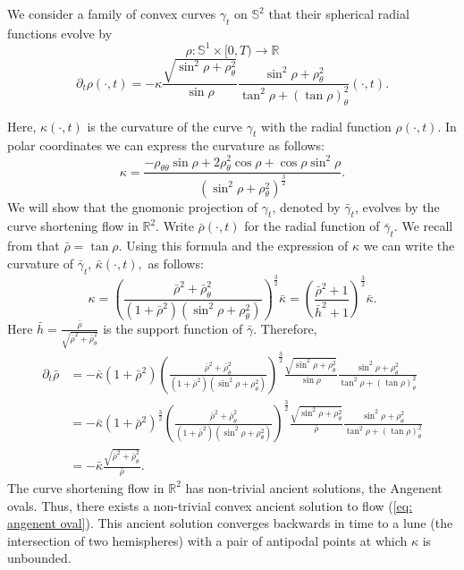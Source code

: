 \documentclass{amsart}
\begin{document}
\begin{example}
We consider a family of convex curves $\gamma_t$ on $\mathbb{S}^2$ that their spherical radial functions evolve by
\[\rho:\mathbb{S}^1\times[0,T)\to \mathbb{R}\]
\begin{equation}\label{eq: angenent oval}
\partial_t\rho(\cdot,t)=-\kappa \frac{\sqrt{\sin^2\rho+\rho_{\theta}^2}}{\sin\rho}\frac{\sin^2\rho+\rho_{\theta}^2}{\tan^2\rho+(\tan\rho)_{\theta}^2}(\cdot,t).
\end{equation}

Here, $\kappa(\cdot,t)$ is the curvature of the curve $\gamma_t$ with the radial function $\rho(\cdot,t).$ 
In polar coordinates we can express the curvature as follows:
\[\kappa=\frac{-\rho_{\theta\theta}\sin\rho+2\rho_\theta^2\cos\rho+\cos\rho\sin^2\rho}{(\sin^2\rho+\rho_{\theta}^2)^{\frac{3}{2}}}.\]
We will show that the gnomonic projection of $\gamma_t$, denoted by $\bar{\gamma}_t$, evolves by the curve shortening flow in $\mathbb{R}^2.$ Write $\bar{\rho}(\cdot,t)$ for the radial function of $\bar{\gamma}_t$. We recall from \cite[p.~8]{besau2014spherical} that
$\bar{\rho}=\tan\rho.$ Using this formula and the expression of $\kappa$ we can write the curvature of $\bar{\gamma}_t$,  $\bar{\kappa}(\cdot,t),$ as follows:
\[\kappa=\left(\frac{\bar{\rho}^2+\bar{\rho}_{\theta}^2}{(1+\bar{\rho}^2)(\sin^2\rho+\rho_{\theta}^2)}\right)^{\frac{3}{2}}\bar{\kappa}=\left(\frac{\bar{\rho}^2+1}{\bar{h}^2+1}\right)^{\frac{3}{2}}\bar{\kappa}.\]
Here $\bar{h}=\frac{\bar{\rho}}{\sqrt{\bar{\rho}^2+\bar{\rho}_{\theta}^2}}$ is the support function of $\bar{\gamma}.$
Therefore, 
\begin{align*}
\partial_t\bar{\rho}&=-\bar{\kappa}(1+\bar{\rho}^2)\left(\frac{\bar{\rho}^2+\bar{\rho}_{\theta}^2}{(1+\bar{\rho}^2)(\sin^2\rho+\rho_{\theta}^2)}\right)^{\frac{3}{2}}\frac{\sqrt{\sin^2\rho+\rho_{\theta}^2}}{\sin\rho}\frac{\sin^2\rho+\rho_{\theta}^2}{\tan^2\rho+(\tan\rho)_{\theta}^2}\\
&=-\bar{\kappa}(1+\bar{\rho}^2)^{\frac{3}{2}}\left(\frac{\bar{\rho}^2+\bar{\rho}_{\theta}^2}{(1+\bar{\rho}^2)(\sin^2\rho+\rho_{\theta}^2)}\right)^{\frac{3}{2}}\frac{\sqrt{\sin^2\rho+\rho_{\theta}^2}}{\bar{\rho}}\frac{\sin^2\rho+\rho_{\theta}^2}{\tan^2\rho+(\tan\rho)_{\theta}^2}\\
&=-\bar{\kappa}\frac{\sqrt{\bar{\rho}^2+\bar{\rho}_{\theta}^2}}{\bar{\rho}}.
\end{align*}
The curve shortening flow in $\mathbb{R}^2$ has non-trivial ancient solutions, the Angenent ovals. Thus, there exists a non-trivial convex ancient solution to flow (\ref{eq: angenent oval}). This ancient solution converges backwards in time to a lune (the intersection of two hemispheres) with a pair of antipodal points at which \(\kappa\) is unbounded.
\end{example}
\end{document}
